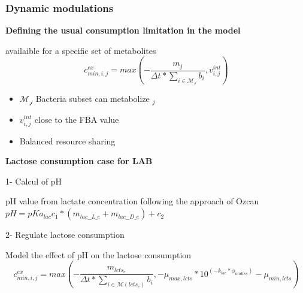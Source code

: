 \documentclass[8pt,usenames,dvipsnames]{beamer}
\begin{document}
\begin{frame}
\frametitle{Dynamic modulations}

\textbf{Defining the usual consumption limitation in the model}
\begin{block}{availaible for a specific set of metabolites}
\begin{equation}
c^{ex}_{min,i,j} = max(-\frac{m_{j}}{\Delta t*\sum_{i \in \mathcal{M_j}} b_i}, v^{int}_{i,j})
\end{equation}

\begin{itemize}
\item $\mathcal{M_j}$ Bacteria subset can metabolize $_j$
\item $v^{int}_{i,j}$ close to the FBA value
\item Balanced resource sharing 
\end{itemize}

\end{block}

\textbf{Lactose consumption case for LAB}

1- Calcul of pH\\

\begin{block}{pH value from lactate concentration following the approach of Ozcan \tiny \citep{Ozcan.2020}}
$pH = pKa_{lac} c_1 * (m_{lac\_\_L\_e}+m_{lac\_\_D\_e})+c_2$
\end{block}

2- Regulate lactose consumption \\
\begin{block}{Model the effect of pH on the lactose consumption}
\begin{equation}
c^{ex}_{min,i,j} = max(-\frac{m_{lcts_e}}{\Delta t*\sum_{i \in \mathcal{M}(lcts_e)} b_i},-\mu_{max,lcts}*10^{(-k_{lac}*\phi_{undiss})}-\mu_{min,lcts})
\end{equation}
\end{block}

%


\end{frame}
\end{document}
